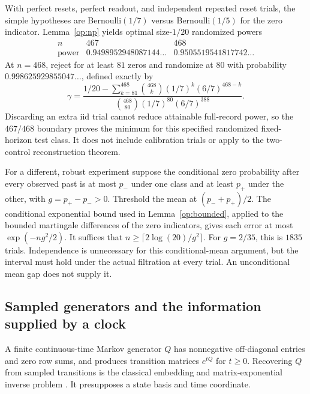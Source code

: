 With perfect resets, perfect readout, and independent repeated reset
trials, the simple hypotheses are Bernoulli\((1/7)\) versus
Bernoulli\((1/5)\) for the zero indicator.
Lemma~\ref{op:np} yields optimal size-\(1/20\) randomized powers
\[
 \begin{array}{c|cc}
 n&467&468\\ \hline
 \text{power}&0.9498952948087144\ldots&
               0.9505519541817742\ldots
 \end{array}
\]
At \(n=468\), reject for at least \(81\) zeros and randomize at \(80\)
with probability \(0.998625929855047\ldots\), defined exactly by
\[
 \gamma=\frac{1/20-
   \sum_{k=81}^{468}\binom{468}{k}(1/7)^k(6/7)^{468-k}}
   {\binom{468}{80}(1/7)^{80}(6/7)^{388}}.
\]
Discarding an extra iid trial cannot reduce attainable full-record
power, so the \(467/468\) boundary proves the minimum for this specified
randomized fixed-horizon test class.  It does not include calibration
trials or apply to the two-control reconstruction theorem.

For a different, robust experiment suppose the conditional zero
probability after every observed past is at most \(p_-\) under one
class and at least \(p_+\) under the other, with \(g=p_+-p_->0\).
Threshold the mean at \((p_-+p_+)/2\).
The conditional exponential bound used in
Lemma~\ref{op:bounded}, applied to the bounded martingale differences
of the zero indicators, gives each error at most
\(\exp(-ng^2/2)\).
It suffices that \(n\ge\lceil2\log(20)/g^2\rceil\).
For \(g=2/35\), this is \(1835\) trials.
Independence is unnecessary for this conditional-mean argument, but
the interval must hold under the actual filtration at every trial.
An unconditional mean gap does not supply it.

\subsection{Sampled generators and the information supplied by a clock}
\label{op:time}

A finite continuous-time Markov generator \(Q\) has nonnegative
off-diagonal entries and zero row sums, and produces transition
matrices \(e^{tQ}\) for \(t\ge0\).
Recovering \(Q\) from sampled transitions is the classical embedding
and matrix-exponential inverse problem
\cite{op:baake,op:yue}.  It presupposes a state basis and time coordinate.

